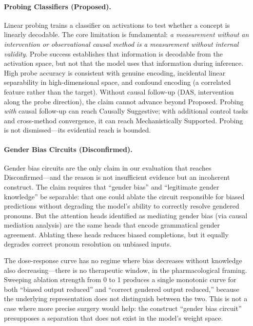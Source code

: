 \documentclass{article}
\begin{document}
\paragraph{Probing Classifiers (Proposed).} Linear probing \citep{belinkov2022probing} trains a classifier on activations to test whether a concept is linearly decodable. The core limitation is fundamental: \emph{a measurement without an intervention or observational causal method is a measurement without internal validity}. Probe success establishes that information is decodable from the activation space, but not that the model uses that information during inference. High probe accuracy is consistent with genuine encoding, incidental linear separability in high-dimensional space, and confound encoding (a correlated feature rather than the target). Without causal follow-up (DAS, intervention along the probe direction), the claim cannot advance beyond Proposed. Probing \emph{with} causal follow-up can reach Causally Suggestive; with additional control tasks and cross-method convergence, it can reach Mechanistically Supported. Probing is not dismissed---its evidential reach is bounded.

\paragraph{Gender Bias Circuits (Disconfirmed).} Gender bias circuits \citep{vig2020gender} are the only claim in our evaluation that reaches Disconfirmed---and the reason is not insufficient evidence but an incoherent construct. The claim requires that ``gender bias'' and ``legitimate gender knowledge'' be separable: that one could ablate the circuit responsible for biased predictions without degrading the model's ability to correctly resolve gendered pronouns. But the attention heads identified as mediating gender bias (via causal mediation analysis) are the same heads that encode grammatical gender agreement. Ablating these heads reduces biased completions, but it equally degrades correct pronoun resolution on unbiased inputs.

The dose-response curve has no regime where bias decreases without knowledge also decreasing---there is no therapeutic window, in the pharmacological framing. Sweeping ablation strength from 0 to 1 produces a single monotonic curve for both ``biased output reduced'' and ``correct gendered output reduced,'' because the underlying representation does not distinguish between the two. This is not a case where more precise surgery would help: the construct ``gender bias circuit'' presupposes a separation that does not exist in the model's weight space.
\end{document}
